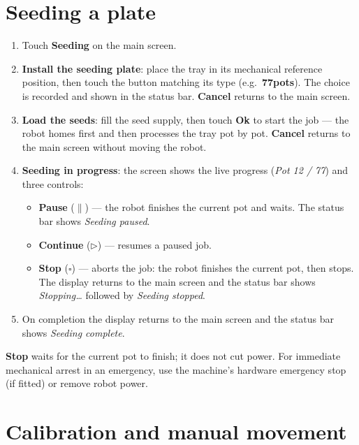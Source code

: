 \section{Seeding a plate}
\label{sec:seeding}

\begin{enumerate}[itemsep=3pt]
  \item Touch \textbf{Seeding} on the main screen.
  \item \textbf{Install the seeding plate}: place the tray in its mechanical
        reference position, then touch the button matching its type
        (e.g.\ \textbf{77pots}). The choice is recorded and shown in the status bar.
        \textbf{Cancel} returns to the main screen.
  \item \textbf{Load the seeds}: fill the seed supply, then touch \textbf{Ok} to
        start the job --- the robot homes first and then processes the tray pot by
        pot. \textbf{Cancel} returns to the main screen without moving the robot.
  \item \textbf{Seeding in progress}: the screen shows the live progress
        (\emph{Pot 12 / 77}) and three controls:
    \begin{itemize}[itemsep=1pt]
      \item \textbf{Pause} ($\parallel$) --- the robot finishes the current pot and
            waits. The status bar shows \emph{Seeding paused}.
      \item \textbf{Continue} ($\triangleright$) --- resumes a paused job.
      \item \textbf{Stop} ($\square$) --- aborts the job: the robot finishes the
            current pot, then stops. The display returns to the main screen and the
            status bar shows \emph{Stopping\dots} followed by \emph{Seeding stopped}.
    \end{itemize}
  \item On completion the display returns to the main screen and the status bar
        shows \emph{Seeding complete}.
\end{enumerate}

\begin{warning}
\textbf{Stop} waits for the current pot to finish; it does not cut power. For
immediate mechanical arrest in an emergency, use the machine's hardware
emergency stop (if fitted) or remove robot power.
\end{warning}

\section{Calibration and manual movement}
\label{sec:calibration}

